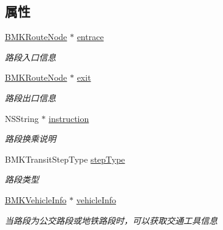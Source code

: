 \subsection*{属性}
\begin{DoxyCompactItemize}
\item 
\hypertarget{interface_b_m_k_transit_step_a8241c007efc75882537c83cf7c49d403}{}\hyperlink{interface_b_m_k_route_node}{B\+M\+K\+Route\+Node} $\ast$ \hyperlink{interface_b_m_k_transit_step_a8241c007efc75882537c83cf7c49d403}{entrace}\label{interface_b_m_k_transit_step_a8241c007efc75882537c83cf7c49d403}

\begin{DoxyCompactList}\small\item\em 路段入口信息 \end{DoxyCompactList}\item 
\hypertarget{interface_b_m_k_transit_step_ab3971103f9cd325a79712eaa09e341f5}{}\hyperlink{interface_b_m_k_route_node}{B\+M\+K\+Route\+Node} $\ast$ \hyperlink{interface_b_m_k_transit_step_ab3971103f9cd325a79712eaa09e341f5}{exit}\label{interface_b_m_k_transit_step_ab3971103f9cd325a79712eaa09e341f5}

\begin{DoxyCompactList}\small\item\em 路段出口信息 \end{DoxyCompactList}\item 
\hypertarget{interface_b_m_k_transit_step_abb426a15b7ebf35ea6a7aacb87023391}{}N\+S\+String $\ast$ \hyperlink{interface_b_m_k_transit_step_abb426a15b7ebf35ea6a7aacb87023391}{instruction}\label{interface_b_m_k_transit_step_abb426a15b7ebf35ea6a7aacb87023391}

\begin{DoxyCompactList}\small\item\em 路段换乘说明 \end{DoxyCompactList}\item 
\hypertarget{interface_b_m_k_transit_step_a19dc0d26a9b5908704fea8d9a2ea3328}{}B\+M\+K\+Transit\+Step\+Type \hyperlink{interface_b_m_k_transit_step_a19dc0d26a9b5908704fea8d9a2ea3328}{step\+Type}\label{interface_b_m_k_transit_step_a19dc0d26a9b5908704fea8d9a2ea3328}

\begin{DoxyCompactList}\small\item\em 路段类型 \end{DoxyCompactList}\item 
\hypertarget{interface_b_m_k_transit_step_aa8fd99fdc509dbccab356e9388974978}{}\hyperlink{interface_b_m_k_vehicle_info}{B\+M\+K\+Vehicle\+Info} $\ast$ \hyperlink{interface_b_m_k_transit_step_aa8fd99fdc509dbccab356e9388974978}{vehicle\+Info}\label{interface_b_m_k_transit_step_aa8fd99fdc509dbccab356e9388974978}

\begin{DoxyCompactList}\small\item\em 当路段为公交路段或地铁路段时，可以获取交通工具信息 \end{DoxyCompactList}\end{DoxyCompactItemize}


